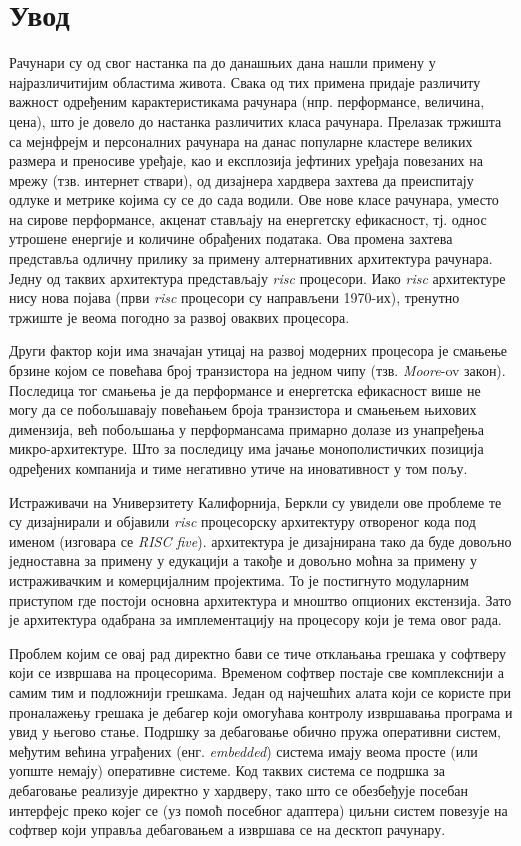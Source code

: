 \chapter{Увод}

Рачунари су од свог настанка па до данашњих дана нашли примену у најразличитијим областима живота.
Свака од тих примена придаје различиту важност одређеним карактеристикама рачунара (нпр. перформансе, величина, цена),
што је довело до настанка различитих класа рачунара. Прелазак тржишта са мејнфрејм и персоналних рачунара на данас популарне кластере великих размера и преносиве уређаје, као и експлозија јефтиних уређаја повезаних на мрежу (тзв. интернет ствари), од дизајнера хардвера захтева да преиспитају одлуке и метрике којима су се до сада водили.
Ове нове класе рачунара, уместо на сирове перформансе, акценат стављају на енергетску ефикасност, тј. однос утрошене енергије и количине обрађених података.
Ова промена захтева представља одличну прилику за примену алтернативних архитектура рачунара. Једну од таквих архитектура представљају \textit{\acrfull{risc}} процесори. Иако  \textit{\acrshort{risc}} архитектуре нису нова појава (први \textit{\acrshort{risc}} процесори су направљени 1970-их), тренутно тржиште је веома погодно за развој оваквих процесора.

Други фактор који има значајан утицај на развој модерних процесора је смањење брзине којом се повећава број транзистора на једном чипу (тзв. \textit{Moore}-ov закон).
Последица тог смањења је да перформансе и енергетска ефикасност више не могу да се побољшавају повећањем броја транзистора и смањењем њихових димензија, већ побољшања у перформансама примарно долазе из унапређења микро-архитектуре. Што за последицу има јачање монополистичких позиција одређених компанија и тиме негативно утиче на иновативност у том пољу.

Истраживачи на Универзитету Калифорнија, Беркли су увидели ове проблеме те су дизајнирали и објавили \textit{\acrshort{risc}} процесорску архитектуру отвореног кода под именом  \cite{riscv} (изговара се \textit{RISC five}).  архитектура је дизајнирана тако да буде довољно једноставна за примену у едукацији а такође и довољно моћна за примену у истраживачким \cite{rocket} и комерцијалним \cite{sifive} \cite{tenstorrent} пројектима. То је постигнуто модуларним приступом где постоји основна архитектура и мноштво опционих екстензија. Зато је  архитектура одабрана за имплементацију на процесору који је тема овог рада.

Проблем којим се овај рад директно бави се тиче отклањања грешака у софтверу који се извршава на  процесорима.
Временом софтвер постаје све комплекснији а самим тим и подложнији грешкама. 
Један од најчешћих алата који се користе при проналажењу грешака је дебагер који омогућава контролу извршавања програма и увид у његово стање.
Подршку за дебаговање обично пружа оперативни систем, међутим већина уграђених (енг. \textit{embedded}) система имају веома просте (или уопште немају) оперативне системе.
Код таквих система се подршка за дебаговање реализује директно у хардверу, тако што се обезбеђује посебан интерфејс преко којег се (уз помоћ посебног адаптера) циљни систем повезује на софтвер који управља дебаговањем а извршава се на десктоп рачунару.

